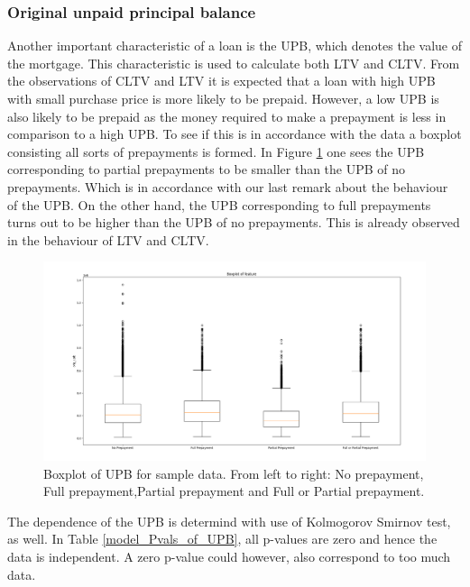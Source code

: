    \subsubsection{Original unpaid principal balance}
        Another important characteristic of a loan is the UPB, which denotes the value of the mortgage. This characteristic is used to calculate both LTV and CLTV. From the observations of CLTV and LTV it is expected that a loan with high UPB with small purchase price is more likely to be prepaid. However, a low UPB is also likely to be prepaid as the money required to make a prepayment is less in comparison to a high UPB. To see if this is in accordance with the data a boxplot consisting all sorts of prepayments is formed. In Figure \ref{model_boxplot_UPB} one sees the UPB corresponding to partial prepayments to be smaller than the UPB of no prepayments. Which is in accordance with our last remark about the behaviour of the UPB. On the other hand, the UPB corresponding to full prepayments turns out to be higher than the UPB of no prepayments. This is already observed in the behaviour of LTV and CLTV. 
        \begin{figure}[H]
            \centering
            \includegraphics[width=\linewidth]{Latex/Report/Figures/Boxplot_of_upb_[2013, 2014, 2015, 2016, 2017, 2018, 2019, 2020]_.png}
            \caption{Boxplot of UPB for sample data. From left to right: No prepayment, Full prepayment,Partial prepayment and Full or Partial prepayment.}
            \label{model_boxplot_UPB}
        \end{figure}
        \noindent
        The dependence of the UPB is determind with use of Kolmogorov Smirnov test, as well. In Table \ref{model_Pvals_of_UPB}, all p-values are zero and hence the data is independent. A zero p-value could however, also correspond to too much data. 
